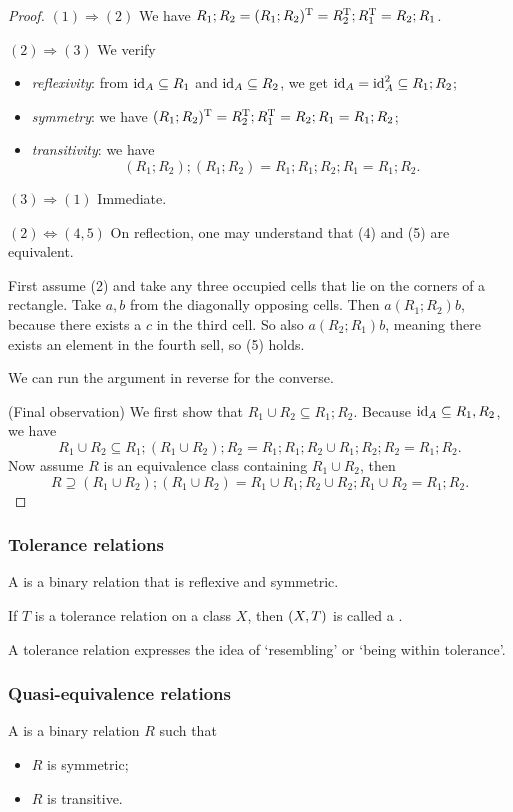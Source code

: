 \begin{proof}
$(1)\Rightarrow (2)$ We have $R_1;R_2 = (R_1;R_2)^{\mathrm{T}} = R_2^{\mathrm{T}}; R_1^{\mathrm{T}} = R_2;R_1$.

$(2)\Rightarrow (3)$ We verify
\begin{itemize}
\item \emph{reflexivity}: from $\operatorname{id}_A \subseteq R_1$ and $\operatorname{id}_A \subseteq R_2$, we get $\operatorname{id}_A = \operatorname{id}_A^2 \subseteq R_1;R_2$;
\item \emph{symmetry}: we have $(R_1;R_2)^{\mathrm{T}} = R_2^{\mathrm{T}}; R_1^{\mathrm{T}} = R_2;R_1 = R_1;R_2$;
\item \emph{transitivity}: we have
\[ (R_1;R_2);(R_1; R_2) = R_1;R_1;R_2;R_1 = R_1;R_2. \]
\end{itemize}

$(3)\Rightarrow (1)$ Immediate.

$(2)\Leftrightarrow (4, 5)$ On reflection, one may understand that (4) and (5) are equivalent.

First assume (2) and take any three occupied cells that lie on the corners of a rectangle. Take $a,b$ from the diagonally opposing cells. Then $a(R_1;R_2)b$, because there exists a $c$ in the third cell. So also $a(R_2;R_1)b$, meaning there exists an element in the fourth sell, so (5) holds.

We can run the argument in reverse for the converse.

(Final observation) We first show that $R_1\cup R_2 \subseteq R_1;R_2$. Because $\operatorname{id}_A \subseteq R_1, R_2$, we have
\[ R_1\cup R_2 \subseteq R_1;(R_1\cup R_2);R_2 = R_1;R_1;R_2 \cup R_1;R_2;R_2 = R_1;R_2. \]
Now assume $R$ is an equivalence class containing $R_1\cup R_2$, then
\[ R \supseteq (R_1\cup R_2);(R_1\cup R_2) = R_1 \cup R_1;R_2 \cup R_2;R_1 \cup R_2 = R_1;R_2. \]
\end{proof}

\subsubsection{Tolerance relations}
\begin{definition}
A  is a binary relation that is reflexive and symmetric.

If $T$ is a tolerance relation on a class $X$, then $\left( X,T \right)$ is called a .
\end{definition}
A tolerance relation expresses the idea of `resembling' or `being within tolerance'.

\subsubsection{Quasi-equivalence relations}
\begin{definition}
A  is a binary relation $R$ such that
\begin{itemize}
\item $R$ is symmetric;
\item $R$ is transitive.
\end{itemize}
\end{definition}

